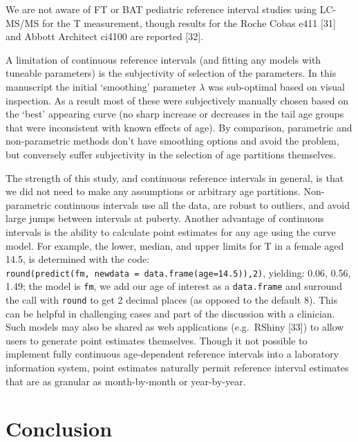 \documentclass[]{elsarticle} %
\begin{document}
We are not aware of FT or BAT pediatric reference interval studies using
LC-MS/MS for the T measurement, though results for the Roche Cobas e411
{[}31{]} and Abbott Architect ci4100 are reported {[}32{]}.

A limitation of continuous reference intervals (and fitting any models
with tuneable parameters) is the subjectivity of selection of the
parameters. In this manuscript the initial `smoothing' parameter
\(\lambda\) was sub-optimal based on visual inspection. As a result most
of these were subjectively manually chosen based on the `best' appearing
curve (no sharp increase or decreases in the tail age groups that were
inconsistent with known effects of age). By comparison, parametric and
non-parametric methods don't have smoothing options and avoid the
problem, but conversely suffer subjectivity in the selection of age
partitions themselves.

The strength of this study, and continuous reference intervals in
general, is that we did not need to make any assumptions or arbitrary
age partitions. Non-parametric continuous intervals use all the data,
are robust to outliers, and avoid large jumps between intervals at
puberty. Another advantage of continuous intervals is the ability to
calculate point estimates for any age using the curve model. For
example, the lower, median, and upper limits for T in a female aged
14.5, is determined with the code:
\texttt{round(predict(fm,\ newdata\ =\ data.frame(age=14.5)),2)},
yielding: 0.06, 0.56, 1.49; the model is \texttt{fm}, we add our age of
interest as a \texttt{data.frame} and surround the call with
\texttt{round} to get 2 decimal places (as opposed to the default 8).
This can be helpful in challenging cases and part of the discussion with
a clinician. Such models may also be shared as web applications
(e.g.~RShiny {[}33{]}) to allow users to generate point estimates
themselves. Though it not possible to implement fully continuous
age-dependent reference intervals into a laboratory information system,
point estimates naturally permit reference interval estimates that are
as granular as month-by-month or year-by-year.

\hypertarget{conclusion}{%
\section{Conclusion}\label{conclusion}}
\end{document}
